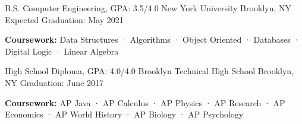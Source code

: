 
\begin{cventries}
  \cventry
    {B.S. Computer Engineering, GPA: 3.5/4.0} %
    {New York University} %
    {Brooklyn, NY} %
    {Expected Graduation: May 2021} %
    {
      \begin{cvitems} %
         \item {\textbf{Coursework: } Data Structures · Algorithms · Object Oriented · Databases · Digital Logic · Linear Algebra}
         \vspace{0.5mm}
      \end{cvitems}
    }
  \cventry
    {High School Diploma, GPA: 4.0/4.0} %
    {Brooklyn Technical High School} %
    {Brooklyn, NY} %
    {Graduation: June 2017} %
    {
      \begin{cvitems} %
         \item {\textbf{Coursework: } AP Java · AP Calculus · AP Physics · AP Research · AP Economics · AP World History · AP Biology · AP Psychology}
         \vspace{0.5mm}
      \end{cvitems}
    }
\end{cventries}
